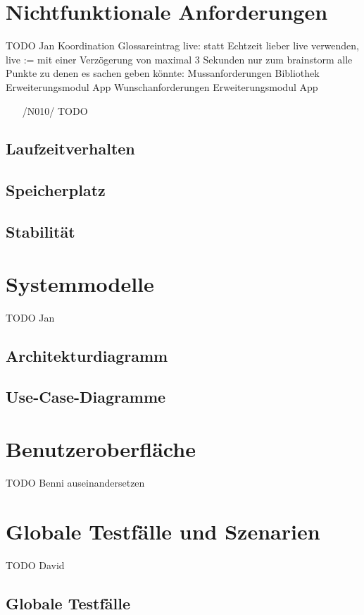 \documentclass[a4paper,12pt]{article}
\begin{document}
\section{Nichtfunktionale Anforderungen}
TODO Jan Koordination
Glossareintrag \glqq live\grqq{}: statt Echtzeit lieber \glqq live\grqq{} verwenden, live := mit einer Verzögerung von maximal 3 Sekunden
  nur zum brainstorm alle Punkte zu denen es sachen geben könnte:
  {Mussanforderungen}
      {Bibliothek}
      {Erweiterungsmodul}
      {App}
    {Wunschanforderungen}
      {Erweiterungsmodul}
      {App}
\begin{itemize}
  \item[/N010/] \textsf{TODO}
\end{itemize}
\subsection{Laufzeitverhalten}
\subsection{Speicherplatz}
\subsection{Stabilität}

\section{Systemmodelle}
TODO Jan
  \subsection{Architekturdiagramm}
  \subsection{Use-Case-Diagramme}
\section{Benutzeroberfläche}
TODO Benni auseinandersetzen
\section{Globale Testfälle und Szenarien}
TODO David
  \subsection{Globale Testfälle}
\end{document}
